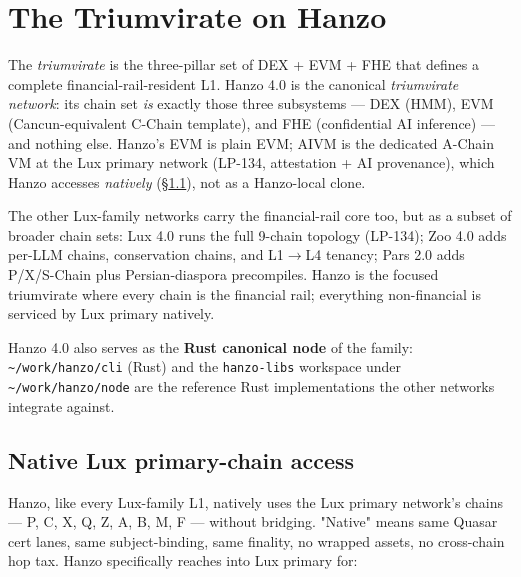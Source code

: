 \documentclass[11pt,letterpaper]{article}
\begin{document}
\section{The Triumvirate on Hanzo}
\label{sec:triumvirate}

The \emph{triumvirate} is the three-pillar set of DEX + EVM + FHE that
defines a complete financial-rail-resident L1. Hanzo 4.0 is the
canonical \emph{triumvirate network}: its chain set \emph{is} exactly
those three subsystems --- DEX (HMM), EVM (Cancun-equivalent C-Chain
template), and FHE (confidential AI inference) --- and nothing else.
Hanzo's EVM is plain EVM; AIVM is the dedicated A-Chain VM at the
Lux primary network (LP-134, attestation + AI provenance), which
Hanzo accesses \emph{natively} (\S\ref{sec:lux-native-access}), not
as a Hanzo-local clone.

The other Lux-family networks carry the financial-rail core too, but
as a subset of broader chain sets: Lux 4.0 runs the full 9-chain
topology (LP-134); Zoo 4.0 adds per-LLM chains, conservation chains,
and L1$\to$L4 tenancy; Pars 2.0 adds P/X/S-Chain plus
Persian-diaspora precompiles. Hanzo is the focused triumvirate where
every chain is the financial rail; everything non-financial is
serviced by Lux primary natively.

Hanzo 4.0 also serves as the \textbf{Rust canonical node} of the family:
\texttt{\textasciitilde/work/hanzo/cli} (Rust) and the
\texttt{hanzo-libs} workspace under \texttt{\textasciitilde/work/hanzo/node}
are the reference Rust implementations the other networks integrate
against.

\subsection{Native Lux primary-chain access}
\label{sec:lux-native-access}

Hanzo, like every Lux-family L1, natively uses the Lux primary
network's chains --- P, C, X, Q, Z, A, B, M, F --- without bridging.
"Native" means same Quasar cert lanes, same subject-binding, same
finality, no wrapped assets, no cross-chain hop tax. Hanzo
specifically reaches into Lux primary for:
\end{document}
